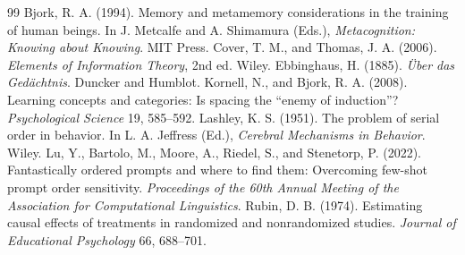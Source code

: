 \documentclass[11pt]{article}
\theoremstyle{remark}
\begin{document}
\begin{thebibliography}{99}\small
{} Bjork, R. A. (1994). Memory and metamemory considerations in the training of human beings. In J. Metcalfe and A. Shimamura (Eds.), \emph{Metacognition: Knowing about Knowing}. MIT Press.
 Cover, T. M., and Thomas, J. A. (2006). \emph{Elements of Information Theory}, 2nd ed. Wiley.
 Ebbinghaus, H. (1885). \emph{\"Uber das Ged\"achtnis}. Duncker and Humblot.
 Kornell, N., and Bjork, R. A. (2008). Learning concepts and categories: Is spacing the ``enemy of induction''? \emph{Psychological Science} 19, 585--592.
 Lashley, K. S. (1951). The problem of serial order in behavior. In L. A. Jeffress (Ed.), \emph{Cerebral Mechanisms in Behavior}. Wiley.
 Lu, Y., Bartolo, M., Moore, A., Riedel, S., and Stenetorp, P. (2022). Fantastically ordered prompts and where to find them: Overcoming few-shot prompt order sensitivity. \emph{Proceedings of the 60th Annual Meeting of the Association for Computational Linguistics}.
 Rubin, D. B. (1974). Estimating causal effects of treatments in randomized and nonrandomized studies. \emph{Journal of Educational Psychology} 66, 688--701.
\end{thebibliography}
\end{document}
